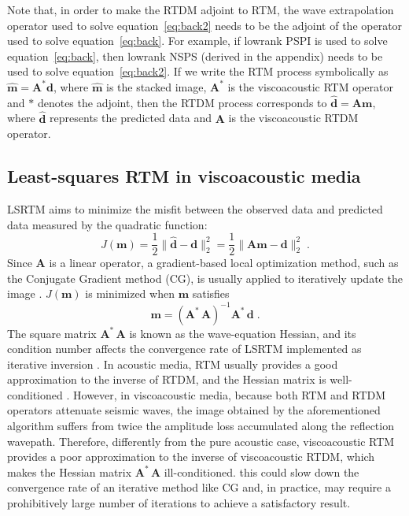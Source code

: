 Note that, in order to make the RTDM adjoint to RTM, the wave extrapolation operator used to solve equation~\ref{eq:back2} needs to be the adjoint of the operator used to solve equation~\ref{eq:back}. For example, if lowrank PSPI is used to solve equation~\ref{eq:back}, then lowrank NSPS (derived in the appendix) needs to be used to solve equation~\ref{eq:back2}. 
If we write the RTM process symbolically as $\widehat{\mathbf{m}} = \mathbf{A}^* \mathbf{d}$, where $\widehat{\mathbf{m}}$ is the stacked image, $\mathbf{A}^*$ is the viscoacoustic RTM operator and $*$ denotes the adjoint, then the RTDM process corresponds to $\widehat{\mathbf{d}} = \mathbf{A} \mathbf{m}$, where $\widehat{\mathbf{d}}$ represents the predicted data and $\mathbf{A}$ is the viscoacoustic RTDM operator.

\subsection{Least-squares RTM in viscoacoustic media}

LSRTM aims to minimize the misfit between the observed data and predicted data measured by the quadratic function:
\begin{equation}
J(\mathbf{m}) = \frac{1}{2}\| \widehat{\mathbf{d}} - \mathbf{d} \|^2_2 = \frac{1}{2}\| \mathbf{A} \mathbf{m} - \mathbf{d} \|^2_2 \; .
\end{equation}
Since $\mathbf{A}$ is a linear operator, a gradient-based local optimization method, such as the Conjugate Gradient method (CG), is usually applied to iteratively update the image \cite[]{dai13,xue14}. $J(\mathbf{m})$ is minimized when $\mathbf{m}$ satisfies \cite[]{ipt}
\begin{equation}
  \label{eq:truemod}
\mathbf{m} = (\mathbf{A}^* \, \mathbf{A})^{-1}\mathbf{A}^* \, \mathbf{d} \; .
\end{equation}
The square matrix $\mathbf{A}^* \, \mathbf{A}$ is known as the wave-equation Hessian, and its condition number affects the convergence rate of LSRTM implemented as  iterative inversion \cite[]{plessix04}. In acoustic media, RTM usually provides a good approximation to the inverse of RTDM, and the Hessian matrix is well-conditioned \cite[]{symes08}. However, in viscoacoustic media, because both RTM and RTDM operators attenuate seismic waves, the image obtained by the aforementioned algorithm suffers from twice the amplitude loss accumulated along the reflection wavepath. Therefore, differently from the pure acoustic case, viscoacoustic RTM provides a poor approximation to the inverse of viscoacoustic RTDM, which makes the Hessian matrix $\mathbf{A}^* \, \mathbf{A}$ ill-conditioned.  this could slow down the convergence rate of an iterative method like CG and, in practice, may require a prohibitively large number of iterations to achieve a satisfactory result.

